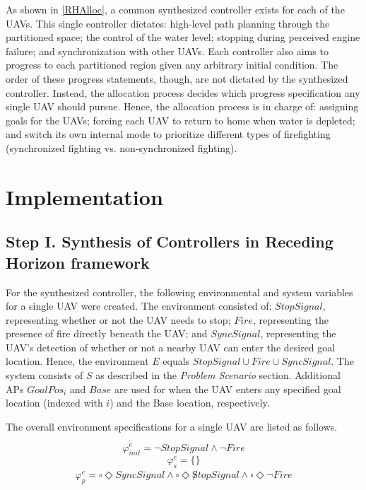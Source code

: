 \documentclass[journal]{IEEEtran}
\newcommand{\always}{\square}
\newcommand{\eventually}{\Diamond}
\begin{document}
As shown in \ref{RHAlloc}, a common synthesized controller exists for each of the UAVs. This single controller dictates: high-level path planning through the partitioned space; the control of the water level; stopping during perceived engine failure; and synchronization with other UAVs. Each controller also aims to progress to each partitioned region given any arbitrary initial condition. The order of these progress statements, though, are not dictated by the synthesized controller. Instead, the allocation process decides which progress specification any single UAV should pursue. Hence, the allocation process is in charge of: assigning goals for the UAVs; forcing each UAV to return to home when water is depleted; and switch its own internal mode to prioritize different types of firefighting (synchronized fighting vs. non-synchronized fighting).

\section{Implementation}
\subsection{Step I. Synthesis of Controllers in Receding Horizon framework}
For the synthesized controller, the following environmental and system variables for a single UAV were created. The environment consisted of: $StopSignal$, representing whether or not the UAV needs to stop; $Fire$, representing the presence of fire directly beneath the UAV; and $SyncSignal$, representing the UAV’s detection of whether or not a nearby UAV can enter the desired goal location. Hence, the environment $E$ equals ${StopSignal \cup Fire \cup SyncSignal}$. The system consists of $S$ as described in the \textit{Problem Scenario} section. Additional APs $GoalPos_i$ and $Base$ are used for when the UAV enters any specified goal location (indexed with $i$) and the Base location, respectively.

The overall environment specifications for a single UAV are listed as follows. 

\begin{equation}
\varphi_{init}^{e} = \lnot StopSignal \land \lnot Fire
\end{equation}
\begin{equation}
\varphi_{s}^{e} = \{\}
\end{equation}
\begin{equation}
\begin{aligned}
\varphi_{p}^{e} = \always \eventually SyncSignal \land \always \eventually \not StopSignal \land \always \eventually \lnot Fire
\end{aligned}
\end{equation}
\end{document}
